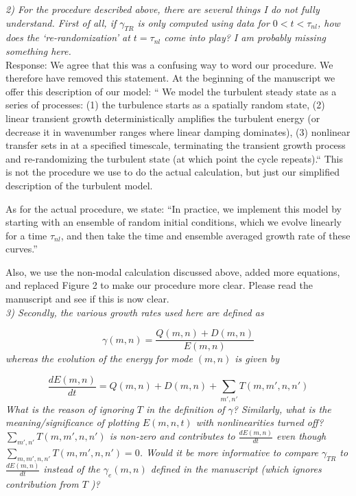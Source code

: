 \documentclass[12pt]{article}
\def\beq{\begin{equation}}
\def\eeq{\end{equation}}
\newcommand{\diff}[2]{\frac{d#1}{d#2}}
\begin{document}
\emph{2) For the procedure described above, there are several things I do not fully understand. First of
all, if $\gamma_{TR}$ is only computed using data for $0 < t < \tau_{nl}$, how does the ‘re-randomization’ at $t = \tau_{nl}$
come into play? I am probably missing something here.} \\


Response: We agree that this was a confusing way to word our
procedure. We therefore have removed this statement. At the beginning of the manuscript we offer this description of our model:
`` We model the turbulent steady state as a series of processes:  (1) the turbulence starts as a spatially random state, (2) linear transient growth deterministically amplifies the turbulent energy (or
decrease it in wavenumber ranges where linear damping dominates), (3) nonlinear transfer sets in at a specified timescale, terminating the transient growth process and re-randomizing the turbulent state (at which point the cycle repeats).`` This is not the procedure we use to do the actual calculation, but just our simplified description of the turbulent model.

As for the actual procedure, we state: ``In practice, we implement this model by starting with an ensemble of random initial conditions, which we evolve linearly for a time $\tau_{nl}$, 
and then take the time and ensemble averaged growth rate of these curves.''

Also, we use the non-modal calculation discussed above, added more equations, and replaced Figure 2 to make our procedure more clear. Please read the manuscript and see if this is now clear.
\\


\emph{3) Secondly, the various growth rates used here are defined as}

\beq
\gamma(m,n) = \frac{Q(m,n) + D(m,n)}{E(m,n)} \nonumber
\eeq
\emph{whereas the evolution of the energy for mode $(m, n)$ is given by}

\beq
\diff{E(m,n)}{t} = Q(m,n) + D(m,n) + \sum_{m',n'} T(m,m',n,n') \nonumber
\eeq
\emph{What is the reason of ignoring $T$ in the definition of $\gamma$? Similarly, what is the meaning/significance
of plotting $E(m, n, t)$ with nonlinearities turned off?  $\sum_{m',n'} T(m,m',n,n')$ is non-zero and contributes to 
$\diff{E(m, n)}{t}$ even though $\sum_{m,m',n,n'} T(m,m',n,n') = 0$. Would it be more informative
to compare $\gamma_{TR}$ to $\diff{E(m, n)}{t}$ instead of the $\gamma_e (m, n)$ defined in the manuscript (which ignores
contribution from $T$ )?} \\
\end{document}
